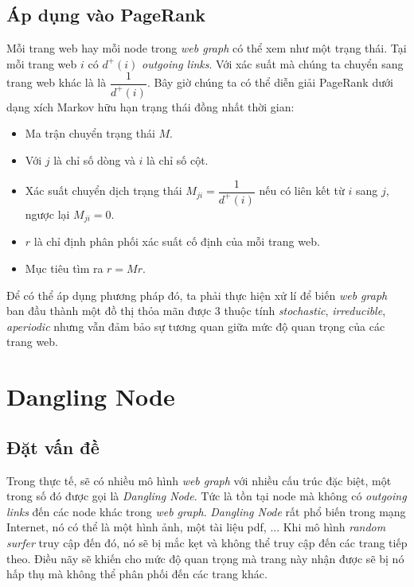 \subsection{Áp dụng vào PageRank}
Mỗi trang web hay mỗi node trong \emph{web graph} có thể xem như một trạng thái. Tại mỗi trang web $i$ có $d^+(i)$ \emph{outgoing links}. Với xác suất mà chúng ta chuyển sang trang web khác là là $\dfrac{1}{d^+(i)}$. Bây giờ chúng ta có thể diễn giải PageRank dưới dạng xích Markov hữu hạn trạng thái đồng nhất thời gian:
\begin{itemize}
    \item Ma trận chuyển trạng thái $M$.
    \item Với $j$ là chỉ số dòng và $i$ là chỉ số cột.
    \item Xác suất chuyển dịch trạng thái $M_{ji} = \dfrac{1}{d^+(i)} $ nếu có liên kết từ $i$ sang $j$, ngược lại $M_{ji} = 0$.

    \item $r$ là chỉ định phân phối xác suất cố định của mỗi trang web.
    \item Mục tiêu tìm ra $r = Mr$.
\end{itemize}
\indent Để có thể áp dụng phương pháp đó, ta phải thực hiện xử lí để biến \emph{web graph} ban đầu thành một đồ thị thỏa mãn được 3 thuộc tính \emph{stochastic}, \emph{irreducible}, \emph{aperiodic} nhưng vẫn đảm bảo sự tương quan giữa mức độ quan trọng của các trang web.
\section{Dangling Node}

\subsection{Đặt vấn đề}
Trong thực tế, sẽ có nhiều mô hình \emph{web graph} với nhiều cấu trúc đặc biệt, một trong số đó được gọi là \emph{Dangling Node}. Tức là tồn tại node mà không có \emph{outgoing links} đến các node khác trong \emph{web graph}. \emph{Dangling Node} rất phổ biến trong mạng Internet, nó có thể là một hình ảnh, một tài liệu pdf, ... Khi mô hình \emph{random surfer} truy cập đến đó, nó sẽ bị mắc kẹt và không thể truy cập đến các trang tiếp theo. Điều nãy sẽ khiến cho mức độ quan trọng mà trang này nhận được sẽ bị nó hấp thụ mà không thể phân phối đến các trang khác.

